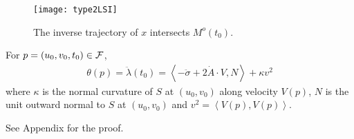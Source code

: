 \documentclass{elsart5p}
\newcommand{\eat}[1]{}
\begin{document}
\begin{figure}
 \centering
 \texttt{[image: type2LSI]}
 \caption{The inverse trajectory of $x$ intersects $M^o(t_0)$.}
 \label{type2LSIFig}
\end{figure}

\begin{thm} \label{lambdaLem}
For $p= (u_0,v_0,t_0) \in {\cal F}$, 
\begin{align*}
\theta(p) = \ddot{\lambda}(t_0) = \left < -\ddot{\sigma} +2\dot{A} \cdot V , N \right > + \kappa v^2 
\end{align*}
 where $\kappa$ is the normal curvature of $S$ at $(u_0,v_0)$ 
along velocity $V(p)$, $N$ is the unit outward normal to $S$ at $(u_0,v_0)$ and 
$v^2 = \left< V(p), V(p) \right>$.
\end{thm}
See Appendix for the proof.
\eat{
\noindent {\em Proof.}
 Differentiating Eq.~\ref{lambdaEq} with respect to time and denoting derivative w.r.t. $t$ by $\dot{}$, we get
\begin{align}
  \dot{ \lambda}(t) &= \left < \dot{\bar y}(t) - \dot{\pi}(t), N(t) \right > + \left < \bar{y}(t) - \pi(t) , \dot{N}(t) \right > \\
\nonumber  \ddot{\lambda}(t) &= \left < \ddot{\bar{y}}(t) - \ddot{\pi}(t), N(t) \right > + 2\left < \dot{\bar y}(t) - \dot{\pi}(t), \dot{N}(t) \right > \\
		&+ \left < \bar{y}(t) - \pi(t), \ddot{N}(t) \right >	\label{ddotLambdaEq}
\end{align}
At $t=t_0$, $\bar{y}(t_0) = \pi(t_0)$.  Since $ \dot{y}(t_0)=V(p) \bot N(p)$, it follows from Eq.~B.5 that $\dot{\bar{y}}(t_0) \bot N(p)$.  It is easy to verify that $\dot{\pi}(t_0) = \dot{\bar{y}}(t_0)$.  Hence, 
\begin{align}
\lambda(t_0) = \dot{\lambda}(t_0) = 0 \label{lambdaTNotEq}
\end{align}
From Eq.~\ref{ddotLambdaEq} and Eq.~B.7 it follows that
\begin{align}
\nonumber \ddot{\lambda}(t_0) &= \left < \ddot{\bar{y}}(t_0) - \ddot{\pi}(t_0), N(t_0) \right >\\
					&= \left < -\ddot{y}(t_0) + 2\dot{A}(t_0) \cdot \dot{y}(t_0) - \ddot{\pi}(t_0), N(t_0) \right >  \label{ddotLambdaTNotEq}
\end{align}
Since $\pi(t) \in S(t_0)$  for all $t$ in some neighbourhood $U$ of $t_0$, we have that $\left < \dot{\pi}(t), N(t) \right > = 0, \forall t \in U$.  
Hence $\left < \ddot{\pi}(t), N(t) \right> + \left < \dot{\pi}(t), \dot{N}(t) \right > = 0, \forall t \in U$.  
}
\end{document}
